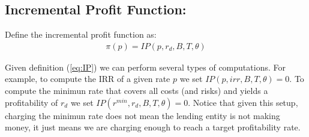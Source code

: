 \subsection{ Incremental Profit Function: }
Define the incremental profit function as:
\begin{align}
\pi(p)=IP(p,r_d,B,T,\theta) \label{eq:IP}
\end{align}

Given definition (\ref{eq:IP}) we can perform several types of computations. For example, to compute the IRR of a given rate $p$ we set $IP(p,irr,B,T,\theta)=0$. To compute the minimun rate that covers all costs (and risks) and yields a profitability of $r_d$ we set $IP(r^{min},r_d,B,T,\theta)=0$. Notice that given this setup, charging the minimun rate does not mean the lending entity is not making money, it just means we are charging enough to reach a target profitability rate.
